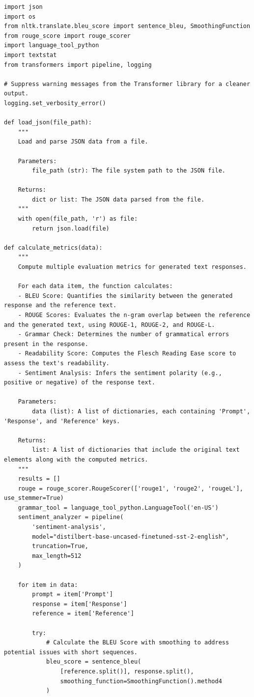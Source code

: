 \begin{lstlisting}[style=Python, caption={Python-data-preperation-for-analysis}, captionpos=b]
import json
import os
from nltk.translate.bleu_score import sentence_bleu, SmoothingFunction
from rouge_score import rouge_scorer
import language_tool_python
import textstat
from transformers import pipeline, logging

# Suppress warning messages from the Transformer library for a cleaner output.
logging.set_verbosity_error()

def load_json(file_path):
    """
    Load and parse JSON data from a file.

    Parameters:
        file_path (str): The file system path to the JSON file.

    Returns:
        dict or list: The JSON data parsed from the file.
    """
    with open(file_path, 'r') as file:
        return json.load(file)

def calculate_metrics(data):
    """
    Compute multiple evaluation metrics for generated text responses.

    For each data item, the function calculates:
    - BLEU Score: Quantifies the similarity between the generated response and the reference text.
    - ROUGE Scores: Evaluates the n-gram overlap between the reference and the generated text, using ROUGE-1, ROUGE-2, and ROUGE-L.
    - Grammar Check: Determines the number of grammatical errors present in the response.
    - Readability Score: Computes the Flesch Reading Ease score to assess the text's readability.
    - Sentiment Analysis: Infers the sentiment polarity (e.g., positive or negative) of the response text.

    Parameters:
        data (list): A list of dictionaries, each containing 'Prompt', 'Response', and 'Reference' keys.

    Returns:
        list: A list of dictionaries that include the original text elements along with the computed metrics.
    """
    results = []
    rouge = rouge_scorer.RougeScorer(['rouge1', 'rouge2', 'rougeL'], use_stemmer=True)
    grammar_tool = language_tool_python.LanguageTool('en-US')
    sentiment_analyzer = pipeline(
        'sentiment-analysis', 
        model="distilbert-base-uncased-finetuned-sst-2-english",
        truncation=True,
        max_length=512
    )

    for item in data:
        prompt = item['Prompt']
        response = item['Response']
        reference = item['Reference']

        try:
            # Calculate the BLEU Score with smoothing to address potential issues with short sequences.
            bleu_score = sentence_bleu(
                [reference.split()], response.split(), 
                smoothing_function=SmoothingFunction().method4
            )


\end{lstlisting}
